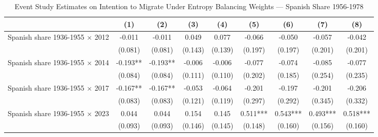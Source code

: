 \begin{table}
\caption{Event Study Estimates on Intention to Migrate Under Entropy Balancing Weights — Spanish Share 1956-1978}
\renewcommand{\arraystretch}{1.25}
\centering
\begin{tabular}[t]{lcccccccc}
\hline
  & (1) & (2) & (3) & (4) & (5) & (6) & (7) & (8)\\
\hline
Spanish share 1936-1955 $\times$ 2012 & -0.011 & -0.011 & 0.049 & 0.077 & -0.066 & -0.050 & -0.057 & -0.042\\
 & (0.081) & (0.081) & (0.143) & (0.139) & (0.197) & (0.197) & (0.201) & (0.201)\\
Spanish share 1936-1955 $\times$ 2014 & -0.193** & -0.193** & -0.006 & -0.006 & -0.077 & -0.074 & -0.085 & -0.077\\
 & (0.084) & (0.084) & (0.111) & (0.110) & (0.202) & (0.185) & (0.254) & (0.235)\\
Spanish share 1936-1955 $\times$ 2017 & -0.167** & -0.167** & -0.053 & -0.064 & -0.201 & -0.197 & -0.201 & -0.206\\
 & (0.083) & (0.083) & (0.121) & (0.119) & (0.297) & (0.292) & (0.345) & (0.332)\\
Spanish share 1936-1955 $\times$ 2023 & 0.044 & 0.044 & 0.154 & 0.145 & 0.511*** & 0.543*** & 0.493*** & 0.518***\\
 & (0.093) & (0.093) & (0.146) & (0.145) & (0.148) & (0.160) & (0.156) & (0.160)\\


\end{tabular}
\end{table}
